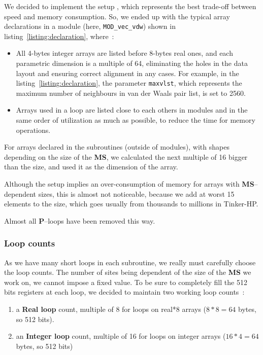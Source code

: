 \documentclass[9pt,comparison]{livecoms}
\newcommand{\lv}{\Large\verb}
\newlength{\mytabsav}
\begin{document}
\setlength\tabcolsep\mytabsav %
We decided to implement the setup {\huge{}}, which represents the best trade-off between speed and memory consumption. So, we ended up with the typical array declarations in a module (here, {\color{codepurple}\lv|MOD_vec_vdw|}) shown in listing~\ref{listing:declaration}, where~:


\begin{itemize}
    \item All 4-bytes integer arrays are listed before 8-bytes real ones, and each parametric dimension is a multiple of 64, eliminating the holes in the data layout and ensuring correct alignment in any cases. For example, in the listing~\ref{listing:declaration}, the parameter {\color{blue}\lv|maxvlst|}, which represents the maximum number of neighbours in van der Waals pair list,  is set to 2560.
    \item Arrays used in a loop are listed close to each others in modules and in the same order of utilization as much as possible, to reduce the time for memory operations.
\end{itemize}

For arrays declared in the subroutines (outside of modules), with shapes depending on the size of the \textbf{MS}, we calculated the next multiple of 16 bigger than the size, and used it as the dimension of the array.

Although the setup {\huge{}} implies an over-consumption of memory for arrays with \textbf{MS}--dependent sizes, this is almost not noticeable, because we add at worst 15 elements to the size, which goes usually from thousands to millions in Tinker-HP.

Almost all \textbf{P}--loops have been removed this way.
\subsubsection{Loop counts}
\hspace{\parindent}As we have many short loops in each subroutine, we really must carefully choose the loop counts. The number of sites being dependent of the size of the \textbf{MS} we work on, we cannot impose a fixed value. To be sure to completely fill the 512 bits registers at each loop, we decided to maintain two working loop counts~:
\begin{enumerate}
    \item a \textbf{Real loop} count, multiple of 8 for loops on {\color{codegreen} real*8} arrays ($8*8=64$ bytes, so 512 bits).
    \item an \textbf{Integer loop} count, multiple of 16 for loops on {\color{codegreen} integer} arrays ($16*4=64$ bytes, so 512 bits)
\end{enumerate}
\end{document}
